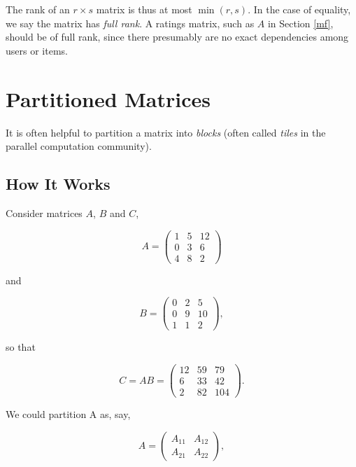 The rank of an $r \times s$ matrix is thus at most $\min(r,s)$.  In
the case of equality, we say the matrix has \textit{full rank}.  A
ratings matrix, such as $A$ in Section \ref{mf}, should be of full rank,
since there presumably are no exact dependencies among users or items.

\section{Partitioned Matrices}

It is often helpful to partition a matrix into \textit{blocks} (often
called {\it tiles} in the parallel computation community).

\subsection{How It Works}

Consider matrices $A$, $B$ and $C$,

\begin{equation}
A = 
\left (
\begin{array}{ccc}
1 & 5 & 12 \\
0 & 3 & 6 \\
4 & 8 & 2
\end{array}
\right )
\end{equation}

and

\begin{equation}
B = 
\left (
\begin{array}{ccc}
0 & 2 & 5 \\
0 & 9 & 10 \\
1 & 1 & 2
\end{array}
\right ), 
\end{equation}

so that

\begin{equation}
C = AB = 
\left (
\begin{array}{ccc}
12 & 59 & 79 \\
6 & 33 & 42 \\
2 & 82 & 104
\end{array}
\right ) .
\end{equation}

We could partition A as, say,

\begin{equation}
A =
\left (
\begin{array}{cc}
A_{11} & A_{12} \\
A_{21} & A_{22}
\end{array}
\right ) ,
\end{equation}

